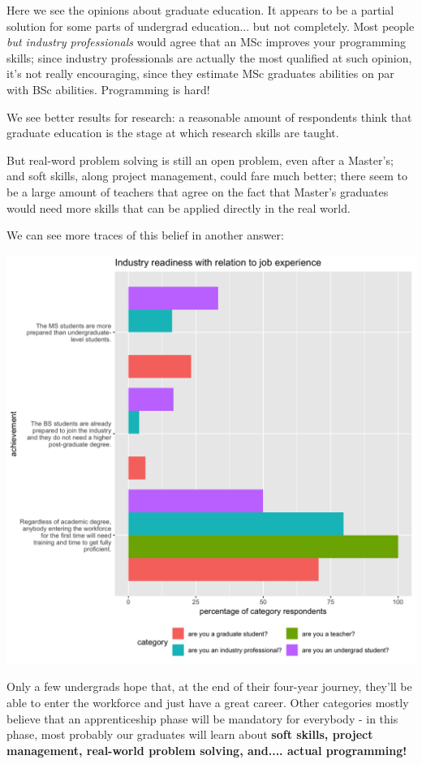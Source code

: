 \documentclass{sigchi}
\begin{document}
Here we see the opinions about graduate education. It appears to be a partial solution for some parts of undergrad education... but not completely. Most people \textit{but industry professionals} would agree that an MSc improves your programming skills; since industry professionals are actually the most qualified at such opinion, it's not really encouraging, since they estimate MSc graduates abilities on par with BSc abilities. Programming is hard!

We see better results for research: a reasonable amount of respondents think that graduate education is the  stage at which research skills are taught.

But real-word problem solving is still an open problem, even after a Master's; and soft skills, along project management, could fare much better; there seem to be a large amount of teachers that agree on the fact that Master's graduates would need more skills that can be applied directly in the real world.

We can see more traces of this belief in another answer:

\includegraphics[scale=0.2]{../data-analysis/plots_output/Industry_readiness_with_relation_to_job_experience.png}

Only a few undergrads hope that, at the end of their four-year journey, they'll be able to enter the workforce and just have a great career. Other categories mostly believe that an apprenticeship phase will be mandatory for everybody - in this phase, most probably our graduates will learn about \textbf{soft skills, project management, real-world problem solving, and.... actual programming!}
\end{document}
